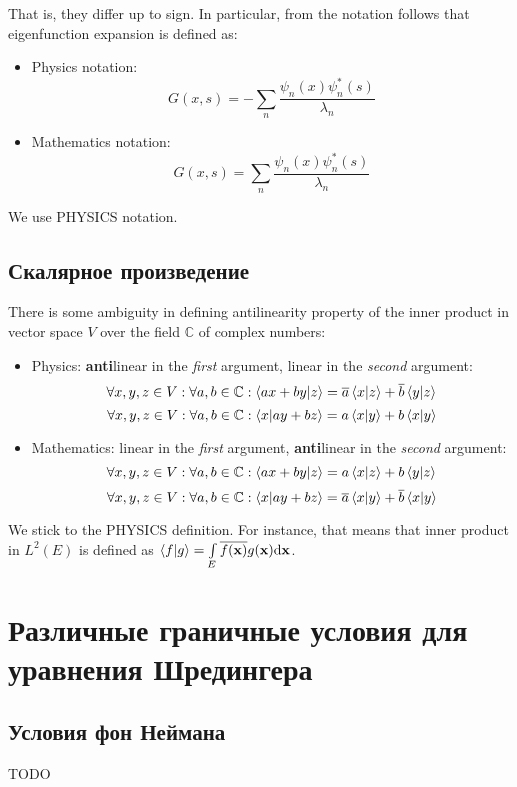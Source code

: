 That is, they differ up to sign. In particular, from the notation follows that eigenfunction expansion is defined as: 

\begin{itemize}
\item Physics notation: $$G(x, s) = -\sum\limits_n \frac{\psi_n(x) \psi_n^*(s)}{\lambda_n}$$
\item Mathematics notation: $$G(x, s) = \sum\limits_n \frac{\psi_n(x) \psi_n^*(s)}{\lambda_n}$$
\end{itemize} 

We use PHYSICS notation.

\subsection{Скалярное произведение}
There is some ambiguity in defining antilinearity property of the inner product in vector space $V$ over the field $\mathbb{C}$ of complex numbers:

\begin{itemize}
\item Physics: \textbf{anti}linear in the \textit{first} argument, linear in the \textit{second} argument:
\[
\forall x, y, z \in V: \forall a, b \in \mathbb{C}: \ip{ax + by}{z} = \cconj{a} \ip{x}{z} + \cconj{b} \ip{y}{z}
\]
\[
\forall x, y, z \in V: \forall a, b \in \mathbb{C}: \ip{x}{ay + bz} = a \ip{x}{y} + b \ip{x}{y}
\]
\item Mathematics: linear in the \textit{first} argument, \textbf{anti}linear in the \textit{second} argument:
\[
\forall x, y, z \in V: \forall a, b \in \mathbb{C}: \ip{ax + by}{z} = a \ip{x}{z} + b \ip{y}{z}
\]
\[
\forall x, y, z \in V: \forall a, b \in \mathbb{C}: \ip{x}{ay + bz} = \cconj{a} \ip{x}{y} + \cconj{b} \ip{x}{y}
\]
\end{itemize}

We stick to the PHYSICS definition. For instance, that means that inner product in $L^2(E)$ is defined as $\ip{f}{g} = \int\limits_E \cconj{f(\vb{x})} g(\vb{x}) \dd \vb{x}$.

\section{Различные граничные условия для уравнения Шредингера}

\subsection{Условия фон Неймана}
TODO

